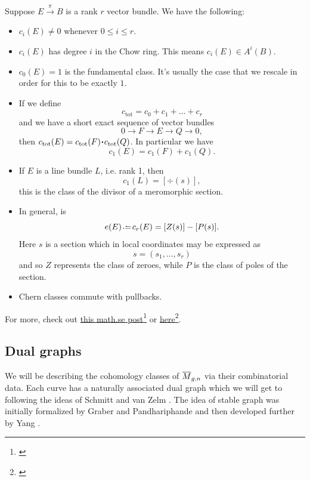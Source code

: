 \documentclass[12pt]{memoir}
\begin{document}
\begin{Th}\label{th-chern-class-cheat-sheet}
    Suppose $E\xrightarrow{\pi}B$ is a rank $r$ vector bundle. We have the following:
\begin{itemize}
    \item $c_i(E)\neq 0$ whenever $0\leq i\leq r$.
    \item $c_i(E)$ has degree $i$ in the Chow ring. This means $c_i(E)\in A^i(B)$.%
    \item $c_0(E)=1$ is the fundamental class. It's usually the case that we rescale in order for this to be exactly $1$.
    \item If we define 
    $$c_{\text{tot}}=c_0+c_1+\dots+c_r$$
    and we have a short exact sequence of vector bundles 
    $$0\to F\to E\to Q\to 0,$$
    then $c_{\text{tot}}(E)=c_{\text{tot}}(F)\.c_{\text{tot}}(Q)$. In particular we have 
    $$c_1(E)=c_1(F)+c_1(Q).$$
    \item If $E$ is a line bundle $L$, i.e. rank 1, then 
    $$c_1(L)=[\div(s)],$$
    this is the class of the divisor of a meromorphic section.
    \item In general,  is
    $$e(E)\defeq c_r(E)=[Z(s)]-[P(s)].$$%
    Here $s$ is a section which in local coordinates may be expressed as 
    $$s=(s_1,...,s_r)$$
    and so $Z$ represents the class of zeroes, while $P$ is the class of poles of the section.
    \item Chern classes commute with pullbacks.
\end{itemize}

For more, check out \href{https://math.stackexchange.com/questions/989147/quick-question-chern-classes-of-sym-wedge-hom-and-tensor}{this math.se post}\footnote{\href{math.stackexchange.com/q/989147/}{}} or \href{https://rigtriv.wordpress.com/2009/11/03/chern-classes-part-1/}{here}\footnote{\href{https://rigtriv.wordpress.com/2009/11/03/chern-classes-part-1/}{}}.

\end{Th}
\subsection{Dual graphs}

We will be describing the cohomology classes of $\overline M_{g,n}$ via their combinatorial data. Each curve has a naturally associated dual graph which we will get to following the ideas of Schmitt and van Zelm \cite{SchmittVanZelm}. The idea of stable graph was initially formalized by Graber and Pandhariphande \cite{GraberPandharipande} and then developed further by Yang \cite{YangIntersections}.\par
\end{document}

